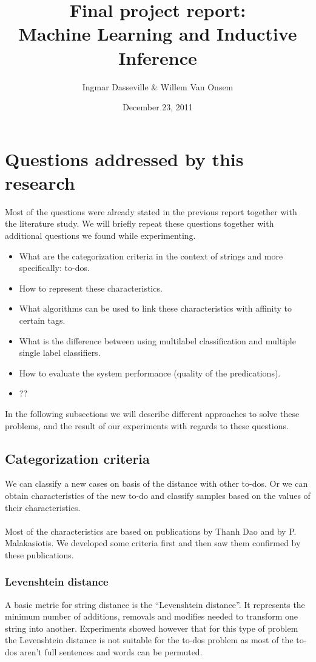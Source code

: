\documentclass[a4paper,titlepage]{article}
\title{Final project report:\\Machine Learning and Inductive Inference}
\author{Ingmar Dasseville \& Willem Van Onsem}
\date{December 23, 2011}
\begin{document}
\begin{titlepage}
\maketitle
\end{titlepage}
\tableofcontents
\newpage
\section{Questions addressed by this research}
Most of the questions were already stated in the previous report together with the literature study. We will briefly repeat these questions together with additional questions we found while experimenting.
\begin{itemize}
 \item What are the categorization criteria in the context of strings and more specifically: to-dos.
 \item How to represent these characteristics.
 \item What algorithms can be used to link these characteristics with affinity to certain tags.
 \item What is the difference between using multilabel classification and multiple single label classifiers.
 \item How to evaluate the system performance (quality of the predications).
 \item ??
\end{itemize}
In the following subsections we will describe different approaches to solve these problems, and the result of our experiments with regards to these questions.
\subsection{Categorization criteria}
We can classify a new cases on basis of the distance with other to-dos. Or we can obtain characteristics of the new to-do and classify samples based on the values of their characteristics.
\paragraph{}
Most of the characteristics are based on publications \cite{codeproject2,codeproject1} by Thanh Dao and \cite{Malakasiotis:2007:LTE:1654536.1654547} by P. Malakasiotis. We developed some criteria first and then saw them confirmed by these publications.
\subsubsection{Levenshtein distance}
A basic metric for string distance is the ``Levenshtein distance''. It represents the minimum number of additions, removals and modifies needed to transform one string into another. Experiments showed however that for this type of problem the Levenshtein distance is not suitable for the to-dos problem as most of the to-dos aren't full sentences and words can be permuted.
\end{document}
